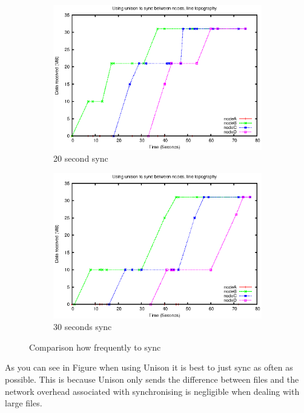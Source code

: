\documentclass[12pt]{article}
\begin{document}
\begin{figure}[htp]
    \begin{subfigure}[b]{0.5\linewidth}
        \centering
        \includegraphics[scale=0.5]{images/line-uni-10-20.eps}
        \caption{20 second sync}
        \label{fig:line_uni_10_20}
    \end{subfigure}
    \begin{subfigure}[b]{0.5\linewidth}
        \centering
        \includegraphics[scale=0.5]{images/line-uni-10-30.eps}
        \caption{30 seconds sync}
        \label{fig:line_uni_10_30}
    \end{subfigure}
    \caption{Comparison how frequently to sync}
\end{figure}

As you can see in Figure 
when using Unison it
is best to just sync as often as possible. This is because Unison only sends
the difference between files and the network overhead associated with
synchronising is negligible when dealing with large files.
\end{document}
